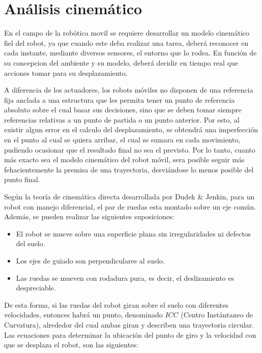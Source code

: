 \documentclass[12pt,a4paper]{article}
\begin{document}
    
    \section{Análisis cinemático}
    
    En el campo de la robótica movil se requiere desarrollar un modelo cinemático fiel del robot, ya que cuando este deba realizar una tarea, deberá reconocer en cada instante, mediante diversos sensores, el entorno que lo rodea.
    En función de su concepcion del ambiente y su modelo, deberá decidir en tiempo real que acciones tomar para su desplazamiento.
    
    A diferencia de los actuadores, los robots móviles no disponen de una referencia fija anclada a una estructura que les permita tener un punto de referencia absoluto sobre el cual basar sus decisiones, sino que se deben tomar siempre referencias relativas a un punto de partida o un punto anterior.
    Por esto, al existir algun error en el calculo del desplazamiento, se obtendrá una imperfección en el punto al cual se quiera arribar, el cual se sumara en cada movimiento, pudiendo ocasionar que el resultado final no sea el previsto.
    Por lo tanto, cuanto más exacto sea el modelo cinemático del robot móvil, sera posible seguir más fehacientemente la premisa de una trayectoria, desviándose lo menos posible del punto final.
    
	Según la teoría de cinemática directa desarrollada por Dudek \& Jenkin, para un robot con manejo diferencial, el par de ruedas esta montado sobre un eje común.
    Además, se pueden realizar las siguientes suposiciones:
    \begin{itemize}
		\item	El robot se mueve sobre una superficie plana sin irregularidades ni defectos del suelo.
        \item	Los ejes de guiado son perpendiculares al suelo.
        \item	Las ruedas se mueven con rodadura pura, es decir, el deslizamiento es despreciable.
	\end{itemize}
    
	De esta forma, si las ruedas del robot giran sobre el suelo con diferentes velocidades, entonces habrá un punto, denominado $ICC$ (Centro Instántaneo de Curvatura), alrededor del cual ambas giran y describen una trayectoria circular.
    Las ecuaciones para determinar la ubicación del punto de giro y la velocidad con que se desplaza el robot, son las siguientes:
    
\end{document}
